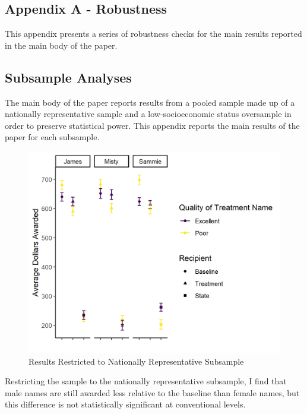 \documentclass[12pt]{article}%
\begin{document}
	
	\begin{doublespace}


\section*{Appendix A - Robustness}
This appendix presents a series of robustness checks for the main results reported in the main body of the paper.

\subsection*{Subsample Analyses}
The main body of the paper reports results from a pooled sample made up of a nationally representative sample and a low-socioeconomic status oversample in order to preserve statistical power. This appendix reports the main results of the paper for each subsample.

\begin{figure}[h!]
	\centering
	\includegraphics[scale=1]{figs/results-gen-pop.png}
	\caption{Results Restricted to Nationally Representative Subsample}
	\label{}
\end{figure}

Restricting the sample to the nationally representative subsample, I find that male names are still awarded less relative to the baseline than female names, but this difference is not statistically significant at conventional levels.


\end{doublespace}
\end{document}
